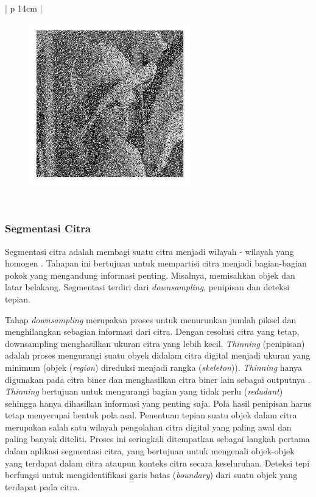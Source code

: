 \begin{table}[H]
	\small
	\begin{adjustbox}{width=1\textwidth}
		\begin{tabular}{| p {14cm} |}
			\hline
			\begin{figure}[H]
				\centering
				\includegraphics[width=7cm]{images/noise_snp}
			\end{figure} \\
			\hline
		\end{tabular}
	\end{adjustbox}
	\label{fig:ContohDerau}
\end{table}

\subsubsection{Segmentasi Citra}
Segmentasi citra adalah membagi suatu citra menjadi wilayah - wilayah yang homogen \cite{gonzalez}. Tahapan ini bertujuan untuk mempartisi citra menjadi bagian-bagian pokok yang mengandung informasi penting. Misalnya, memisahkan objek dan latar belakang. Segmentasi terdiri dari \textit{downsampling}, penipisan dan deteksi tepian. 

Tahap \textit{downsampling} merupakan proses untuk menurunkan jumlah piksel dan menghilangkan sebagian informasi dari citra. Dengan resolusi citra yang tetap, downsampling menghasilkan ukuran citra yang lebih kecil. \textit{Thinning} (penipisan) adalah proses mengurangi suatu obyek didalam citra digital menjadi ukuran yang minimum (objek (\textit{region}) direduksi menjadi rangka (\textit{skeleton})). \textit{Thinning} hanya digunakan pada citra biner dan menghasilkan citra biner lain sebagai outputnya . \textit{Thinning} bertujuan untuk mengurangi bagian yang tidak perlu (\textit{redudant}) sehingga hanya dihasilkan informasi yang penting saja. Pola hasil penipisan harus tetap menyerupai bentuk pola asal. Penentuan tepian suatu objek dalam citra merupakan salah satu wilayah pengolahan citra digital yang paling awal dan paling banyak diteliti. Proses ini seringkali ditempatkan sebagai langkah pertama dalam aplikasi segmentasi citra, yang bertujuan untuk mengenali objek-objek yang terdapat dalam citra ataupun konteks citra secara keseluruhan. Deteksi tepi berfungsi untuk mengidentifikasi garis batas (\textit{boundary}) dari suatu objek yang terdapat pada citra.

